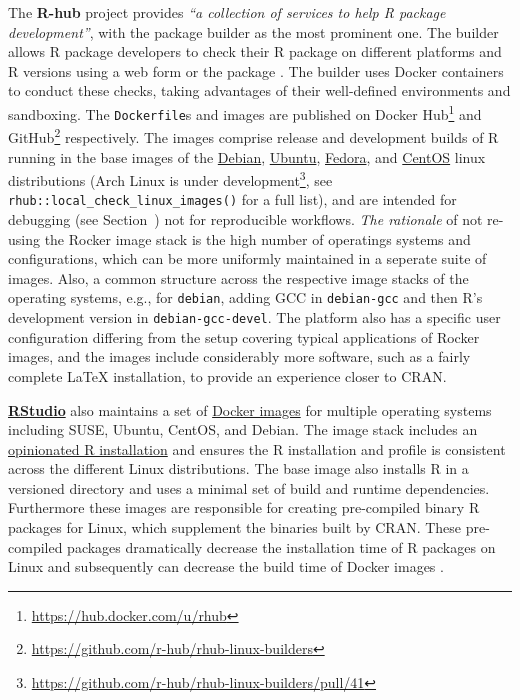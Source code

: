 \label{nondebian}

\label{rhub} The \textbf{R-hub} project provides \emph{``a collection of
services to help R package development''}, with the package builder as
the most prominent one\citep{r-hub_docs_2019}. The builder allows R
package developers to check their R package on different platforms and R
versions using a web form or the package 
\citep{csardi_rhub_2019}. The builder uses Docker containers to conduct
these checks, taking advantages of their well-defined environments and
sandboxing. The \texttt{Dockerfile}s and images are published on Docker
Hub\footnote{\href{https://hub.docker.com/u/rhub}{https://hub.docker.com/u/rhub}}
and
GitHub\footnote{\href{https://github.com/r-hub/rhub-linux-builders}{https://github.com/r-hub/rhub-linux-builders}}
respectively. The images comprise release and development builds of R
running in the base images of the
\href{https://www.debian.org/}{Debian},
\href{https://ubuntu.com/}{Ubuntu},
\href{https://getfedora.org/}{Fedora}, and
\href{https://centos.org/}{CentOS} linux distributions (Arch Linux is
under
development\footnote{\href{https://github.com/r-hub/rhub-linux-builders/pull/41}{https://github.com/r-hub/rhub-linux-builders/pull/41}},
see \texttt{rhub::local\_check\_linux\_images()} for a full list), and
are intended for debugging (see Section~) not for
reproducible workflows. \emph{The rationale} of not re-using the Rocker
image stack is the high number of operatings systems and configurations,
which can be more uniformly maintained in a seperate suite of images.
Also, a common structure across the respective image stacks of the
operating systems, e.g., for \texttt{debian}, adding GCC in
\texttt{debian-gcc} and then R's development version in
\texttt{debian-gcc-devel}. The platform also has a specific user
configuration differing from the setup covering typical applications of
Rocker images, and the images include considerably more software, such
as a fairly complete LaTeX installation, to provide an experience closer
to CRAN.

\href{https://rstudio.com/}{\textbf{RStudio}} also maintains a set of
\href{https://github.com/rstudio/r-docker}{Docker images} for multiple
operating systems including SUSE, Ubuntu, CentOS, and Debian. The image
stack includes an \href{https://github.com/rstudio/r-builds}{opinionated
R installation} and ensures the R installation and profile is consistent
across the different Linux distributions. The base image also installs R
in a versioned directory and uses a minimal set of build and runtime
dependencies. Furthermore these images are responsible for creating
pre-compiled binary R packages for Linux, which supplement the binaries
built by CRAN. These pre-compiled packages dramatically decrease the
installation time of R packages on Linux and subsequently can decrease
the build time of Docker images \citep{lopp_package_2019}.

